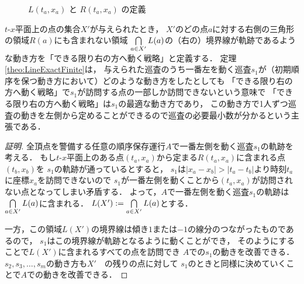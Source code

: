 \begin{figure}[h]
    \centering
    \caption{$L(t_a,x_a)$ と $R(t_a,x_a)$ の定義 \label{tikz:defLR}}
\end{figure}



$t$-$x$平面上の点の集合$X'$が与えられたとき，
$X'$のどの点$a$に対する右側の三角形の領域$R(a)$にも含まれない領域
$\bigcap\limits_{a \in X'} L(a)$の（右の）境界線が軌跡であるような動き方を「できる限り右の方へ動く戦略」と定義する．
%
定理\ref{theo:LineExactFinite}は，
与えられた巡査のうち一番左を動く巡査$s_1$が（初期順序を保つ動き方において）どのような動き方をしたとしても
「できる限り右の方へ動く戦略」で$s_1$が訪問する点の一部しか訪問できないという意味で
「できる限り右の方へ動く戦略」は$s_1$の最適な動き方であり，
この動き方で1人ずつ巡査の動きを左側から定めることができるので巡査の必要最小数が分かるという主張である．




\begin{proof}[証明]
全頂点を警備する任意の順序保存運行$A$で一番左側を動く巡査$s_1$の軌跡を考える．
%
もし$t$-$x$平面上のある点$(t_a,x_a)$から定まる$R(t_a,x_a)$に含まれる点$(t_b,x_b)$を
$s_1$の軌跡が通っているとすると，
$s_1$は$|x_a - x_b| > |t_a - t_b|$より時刻$t_a$に座標$x_a$を訪問できないので
$s_1$が一番左側を動くことから$(t_a,x_a)$が訪問されない点となってしまい矛盾する．
%
よって，$A$で一番左側を動く巡査$s_1$の軌跡は$\bigcap\limits_{a \in X'} L(a)$に含まれる．
$L(X') := \bigcap\limits_{a \in X'} L(a)$とする．

一方，この領域$L(X')$の境界線は傾き$1$または$-1$の線分のつながったものであるので，
$s_1$はこの境界線が軌跡となるように動くことができ，
そのようにすることで$L(X')$に含まれるすべての点を訪問でき
$A$での$s_1$の動きを改善できる．
%
$s_2, s_3, \ldots, s_m$の動き方も$X'$　の残りの点に対して
$s_1$のときと同様に決めていくことで$A$での動きを改善できる．


\end{proof}









